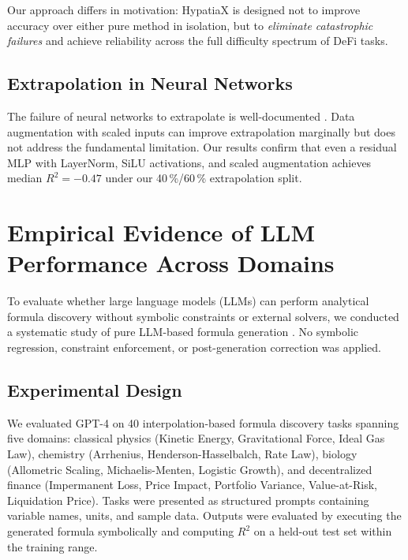 \documentclass[twoside,11pt]{article}
\newcommand{\Rsq}{R^{2}}
\begin{document}
Our approach differs in motivation: HypatiaX is designed not to improve accuracy
over either pure method in isolation, but to \emph{eliminate catastrophic failures}
and achieve reliability across the full difficulty spectrum of DeFi tasks.

\subsection{Extrapolation in Neural Networks}\label{subsec:extrapolation-in-neural-networks}
\label{sec:related_extrap}

The failure of neural networks to extrapolate is well-documented \citep{xu2021neural}.
Data augmentation with scaled inputs \citep{lim2021temporal} can improve extrapolation
marginally but does not address the fundamental limitation.  Our results confirm
that even a residual MLP with LayerNorm, SiLU activations, and scaled augmentation
achieves median $\Rsq=-0.47$ under our 40\,\%/60\,\% extrapolation split.

\section{Empirical Evidence of LLM Performance Across Domains}
\label{sec:llm_limitations}

To evaluate whether large language models (LLMs) can perform analytical formula discovery without symbolic constraints or external solvers, we conducted a systematic study of pure LLM-based formula generation \citep{koza1992genetic,kambhampati2024llms}. No symbolic regression, constraint enforcement, or post-generation correction was applied.

\subsection{Experimental Design}\label{subsec:experimental-design}
\label{sec:llm_exp_design}

We evaluated GPT-4 \citep{openai2023gpt4} on 40 interpolation-based formula discovery tasks spanning five domains: classical physics (Kinetic Energy, Gravitational Force, Ideal Gas Law), chemistry (Arrhenius, Henderson-Hasselbalch, Rate Law), biology (Allometric Scaling, Michaelis-Menten, Logistic Growth), and decentralized finance (Impermanent Loss, Price Impact, Portfolio Variance, Value-at-Risk, Liquidation Price). Tasks were presented as structured prompts containing variable names, units, and sample data. Outputs were evaluated by executing the generated formula symbolically and computing $\Rsq$ on a held-out test set within the training range.
\end{document}
